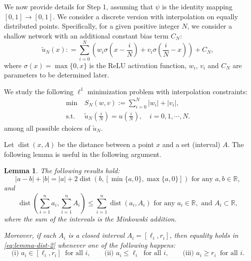 \documentclass[12pt]{amsart}
\numberwithin{equation}{section}
\newtheorem{lemma}{Lemma}[section]
\theoremstyle{remark}
\begin{document}
We now provide details for Step 1, assuming that $\psi$ is the identity mapping $[0,1] \to [0,1]$.
We consider a discrete version with interpolation on equally distributed points.
Specifically, for a given positive integer $N$,
we consider a shallow network with an additional constant bias term $C_N$:
\begin{equation}
   \tilde u_N(x): = \sum_{i=0}^{N} \left(w_i \sigma(x-\frac{i}{N})+ v_i\sigma(\frac i N-x)\right) + C_N,
\end{equation}
where $\sigma(x)=\max\{0, x\}$ is the ReLU activation function,  $w_i$, $v_i$ and $C_N$ are parameters to be determined later.

We study the following $\ell^1$ minimization problem with interpolation constraints:
\begin{align}
    \label{eq:l1_minimization}
   \min ~& S_N(w,v):=  \sum_{i=0}^{N}|w_i|+|v_i|, \\
   \label{eq:interpolation_condition}\text{s.t. }& \tilde u_N(\frac{i}{N})=u(\frac{i}{N}), \quad i=0,1,\cdots, N.
\end{align}
among all possible choices of $\tilde u_N$.

Let $\operatorname{dist}(x,A)$ be the distance between a point $x$ and a set (interval) $A$. The following lemma is useful in the following argument.

\begin{lemma}
    The following results hold:
    \begin{equation} \label{eq:lemma-dist-1} |a-b|+|b| = |a|+ 2\operatorname{dist}(b, [\min\{a, 0\}, \max\{a, 0\}]) \text{ for any }a,b\in \mathbb R,
    \end{equation}
    and
    \begin{equation} \label{eq:lemma-dist-2} \operatorname{dist}(\sum_{i=1}^n a_i, \sum_{i=1}^n A_i)\le \sum_{i=1}^n \operatorname{dist}(a_i, A_i)\text{ for any }a_i\in \mathbb R, \text{ and }A_i\subset \mathbb R,
    \end{equation}
where the sum of the intervals is the Minkowski addition.

Moreover, if each $A_i$ is a closed interval $A_i=[\ell_i,r_i]$, then
equality holds in \eqref{eq:lemma-dist-2} whenever one of the following happens:
\[
\text{(i) } a_i\in [\ell_i,r_i]\ \text{ for all } i,\qquad
\text{(ii) } a_i\le \ell_i\ \text{ for all } i,\qquad
\text{(iii) } a_i\ge r_i\ \text{ for all } i.
\]
\end{lemma}
\end{document}

